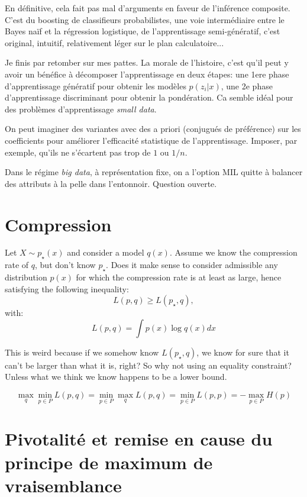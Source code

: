 \documentclass{article}
\begin{document}
En d\'efinitive, cela fait pas mal d'arguments en faveur de l'inf\'erence composite. C'est du boosting de classifieurs probabilistes, une voie interm\'ediaire entre le Bayes na\"if et la r\'egression logistique, de l'apprentissage semi-g\'en\'eratif, c'est original, intuitif, relativement l\'eger sur le plan calculatoire...

Je finis par retomber sur mes pattes. La morale de l'histoire, c'est qu'il peut y avoir un b\'en\'efice \`a  d\'ecomposer l'apprentissage en deux \'etapes: une 1ere phase d'apprentissage g\'en\'eratif pour obtenir les mod\`eles $p(z_i|x)$, une 2e phase d'apprentissage discriminant pour obtenir la pond\'eration. Ca semble id\'eal pour des probl\`emes d'apprentissage {\em small data}. 

On peut imaginer des variantes avec des a priori (conjugu\'es de pr\'ef\'erence) sur les coefficients pour am\'eliorer l'efficacit\'e statistique de l'apprentissage. Imposer, par exemple, qu'ils ne s'\'ecartent pas trop de $1$ ou $1/n$. 

Dans le r\'egime {\em big data}, \`a repr\'esentation fixe, on a l'option MIL quitte \`a balancer des attributs \`a la pelle dans l'entonnoir. Question ouverte. 


\section{Compression}

Let $X\sim p_\star(x)$ and consider a model $q(x)$. Assume we know the compression rate of $q$, but don't know $p_\star$. Does it make sense to consider admissible any distribution $p(x)$ for which the compression rate is at least as large, hence satisfying the following inequality:
$$
L(p,q) \geq L(p_\star,q),
$$
with:
$$
L(p,q) = \int p(x)\log q(x) dx 
$$

This is weird because if we somehow know $L(p_\star,q)$, we know for sure that it can't be larger than what it is, right? So why not using an equality constraint? Unless what we think we know happens to be a lower bound. 


$$
\max_q\min_{p\in P} L(p,q) 
=
\min_{p\in P} \max_q L(p,q)
= \min_{p\in P} L(p,p)
= -\max_{p\in P} H(p)
$$



\section{Pivotalit\'e et remise en cause du principe de maximum de vraisemblance}
\end{document}
